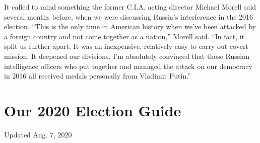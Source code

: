 It called to mind something the former C.I.A. acting director Michael
Morell said several months before, when we were discussing Russia's
interference in the 2016 election. ``This is the only time in American
history when we've been attacked by a foreign country and not come
together as a nation,'' Morell said. ``In fact, it split us further
apart. It was an inexpensive, relatively easy to carry out covert
mission. It deepened our divisions. I'm absolutely convinced that those
Russian intelligence officers who put together and managed the attack on
our democracy in 2016 all received medals personally from Vladimir
Putin.''

\hypertarget{our-2020-election-guide}{%
\section{Our 2020 Election Guide}\label{our-2020-election-guide}}

Updated Aug. 7, 2020

